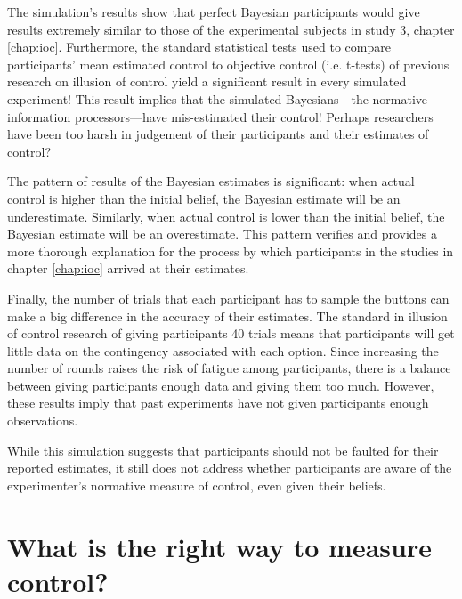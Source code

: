 \documentclass[USenglish,letterpaper,12pt,extrafontsizes,oneside,onecolumn,final]{memoir}
\begin{document}
The simulation's results show that perfect Bayesian participants would give results extremely similar to those of the experimental subjects in study 3, chapter \ref{chap:ioc}.  Furthermore, the standard statistical tests used to compare participants' mean estimated control to objective control (i.e. t-tests) of previous research on illusion of control yield a significant result in every simulated experiment!  This result implies that the simulated Bayesians---the normative information processors---have mis-estimated their control!  Perhaps researchers have been too harsh in judgement of their participants and their estimates of control? 

The pattern of results of the Bayesian estimates is significant: when actual control is higher than the initial belief, the Bayesian estimate will be an underestimate. Similarly, when actual control is lower than the initial belief, the Bayesian estimate will be an overestimate. This pattern verifies and provides a more thorough explanation for the process by which participants in the studies in chapter \ref{chap:ioc} arrived at their estimates.

Finally, the number of trials that each participant has to sample the buttons can make a big difference in the accuracy of their estimates. The standard in illusion of control research of giving participants 40 trials means that participants will get little data on the contingency associated with each option. Since increasing the number of rounds raises the risk of fatigue among participants, there is a balance between giving participants enough data and giving them too much. However, these results imply that past experiments have not given participants enough observations.
 
While this simulation suggests that participants should not be faulted for their reported estimates, it still does not address whether participants are aware of the experimenter's normative measure of control, even given their beliefs.  
 
\section{What is the right way to measure control?}
\end{document}
